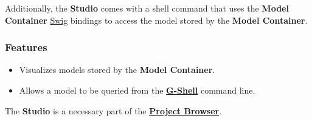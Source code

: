 \documentclass[12pt]{article}
\begin{document}
Additionally, the {\bf Studio} comes with a shell command that uses the {\bf Model Container} \href{http://www.swig.org/}{Swig} bindings to access the model stored by the {\bf Model Container}.

\subsubsection*{Features}

\begin{itemize}

\item Visualizes models stored by the {\bf Model Container}.

\item  Allows a model to be queried from the \href{../gshell/gshell.tex}{\bf G-Shell} command line.

\end{itemize}
The {\bf Studio} is a necessary part of the \href{../project-browser/project-browser.tex}{\bf Project Browser}.
\end{document}

